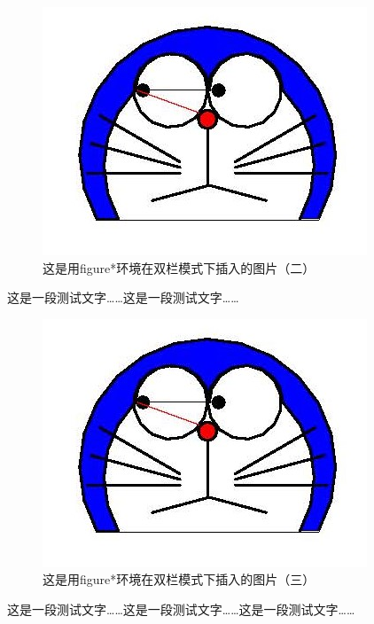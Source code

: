 \documentclass{ctexart}
\begin{document}
            \begin{figure}[htbp]
                \includegraphics[width = .1\textwidth]{doraemon1.jpg}
                \caption{这是用figure*环境在双栏模式下插入的图片（二）}
            \end{figure}
            这是一段测试文字……这是一段测试文字……
            \begin{figure}[htbp]
                \includegraphics[width = .1\textwidth]{doraemon1.jpg}
                \caption{这是用figure*环境在双栏模式下插入的图片（三）}
            \end{figure}
            这是一段测试文字……这是一段测试文字……这是一段测试文字……

            \blindtext[7]

    \onecolumn
\end{document}
